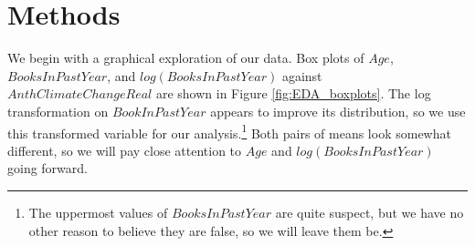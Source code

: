 
\section{Methods}

\par We begin with a graphical exploration of our data. Box plots of $Age$, $BooksInPastYear$, and $log(BooksInPastYear)$ against $AnthClimateChangeReal$ are shown in Figure \ref{fig:EDA_boxplots}. The log transformation on $BookInPastYear$ appears to improve its distribution, so we use this transformed variable for our analysis.\footnote{The uppermost values of $BooksInPastYear$ are quite suspect, but we have no other reason to believe they are false, so we will leave them be.} Both pairs of means look somewhat different, so we will pay close attention to $Age$ and $log(BooksInPastYear)$ going forward.

